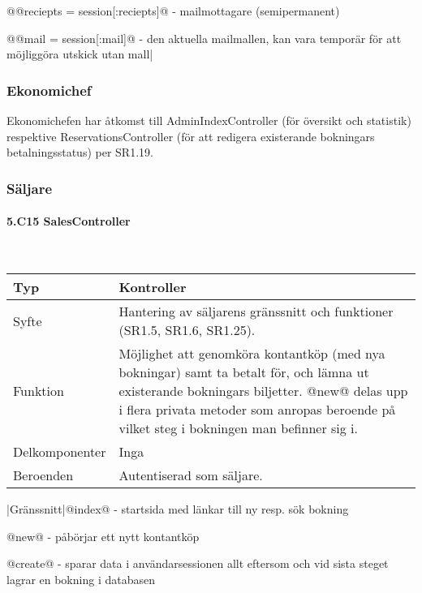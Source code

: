 \documentclass[a4paper, twoside, 11pt, titlepage]{article}
\begin{document}
			@@reciepts = session[:reciepts]@ - mailmottagare (semipermanent)

			@@mail = session[:mail]@ - den aktuella mailmallen, kan vara temporär för att möjliggöra utskick utan mall|

		\subsubsection{Ekonomichef}


		Ekonomichefen har åtkomst till AdminIndexController (för översikt och statistik) respektive ReservationsController (för att redigera existerande bokningars betalningsstatus) per SR1.19.

		\subsubsection{Säljare}



			\paragraph{5.C15 SalesController}\

			\begin {table} [ht] \begin{tabular} {  p{3.5cm} p{9.6cm} }
				\hline
				Typ & Kontroller  \\
				\hline
				Syfte & Hantering av säljarens gränssnitt och funktioner (SR1.5, SR1.6, SR1.25).  \\
				\hline
				Funktion & Möjlighet att genomköra kontantköp (med nya bokningar) samt ta betalt för, och lämna ut existerande bokningars biljetter. @new@ delas upp i flera privata metoder som anropas beroende på vilket steg i bokningen man befinner sig i.  \\
				\hline
				Delkomponenter & Inga  \\
				\hline
				Beroenden & Autentiserad som säljare.  \\
				\hline
			\end{tabular} \end{table} \FloatBarrier
			\vspace{6mm}

			|Gränssnitt|@index@ - startsida med länkar till ny resp. sök bokning

			@new@ - påbörjar ett nytt kontantköp

			@create@ - sparar data i användarsessionen allt eftersom och vid sista steget lagrar en bokning i databasen
\end{document}
